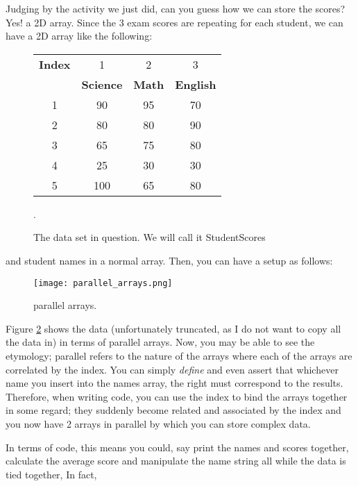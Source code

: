 \documentclass[./main.tex]{subfiles}
\begin{document}
Judging by the activity we just did, can you guess how we can store the scores? Yes! a 2D array. Since the 3 exam scores are repeating for each student, we can have a 2D array like the following:

\begin{figure}[ht]
    \centering
    \begin{tabular}{ |c|c|c|c| }
        \hline 
        \textbf{Index} & 1 & 2  & 3  \\ \cline{2-4}
              & \textbf{Science} & \textbf{Math} & \textbf{English} \\ \hline
        1     & 90      & 95   & 70 \\ \hline
        2     & 80      & 80   & 90 \\ \hline
        3     & 65      & 75   & 80 \\ \hline 
        4     & 25      & 30   & 30 \\ \hline
        5     & 100     & 65   & 80 \\ \hline
    \end{tabular}
    \caption{The data set in question. We will call it {\ccmono StudentScores}}.
    \label{tab:scores_dataset}
\end{figure}

and student names in a normal array. Then, you can have a setup as follows:

\begin{figure}[h]
    \centering
    \texttt{[image: parallel\_arrays.png]}
    \caption{parallel arrays.}
    \label{fig:parallel_arrays}
\end{figure}

Figure \ref{fig:parallel_arrays} shows the data (unfortunately truncated, as I do not want to copy all the data in) in terms of parallel arrays. Now, you may be able to see the etymology; parallel refers to the nature of the arrays where each of the arrays are correlated by the index. You can simply \emph{define} and even assert that whichever name you insert into the names array, the right must correspond to the results. Therefore, when writing code, you can use the index to bind the arrays together in some regard; they suddenly become related and associated by the index and you now have 2 arrays in parallel by which you can store complex data.

In terms of code, this means you could, say print the names and scores together, calculate the average score and manipulate the name string all while the data is tied together, In fact,
\end{document}
